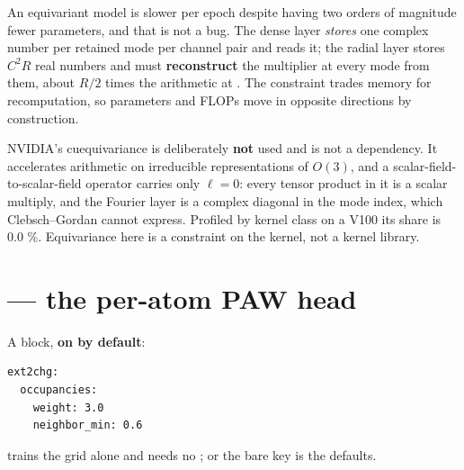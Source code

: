 \begin{pnote}
An equivariant model is slower per epoch despite having two orders of magnitude fewer parameters, and that is not a bug. The dense layer \emph{stores} one complex number per retained mode per channel pair and reads it; the radial layer stores $C^2R$ real numbers and must \textbf{reconstruct} the multiplier at every mode from them, about $R/2$ times the arithmetic at . The constraint trades memory for recomputation, so parameters and FLOPs move in opposite directions by construction.
\end{pnote}

\begin{pwarn}
NVIDIA's cuequivariance is deliberately \textbf{not} used and is not a dependency. It accelerates arithmetic on irreducible representations of $O(3)$, and a scalar-field-to-scalar-field operator carries only $\ell=0$: every tensor product in it is a scalar multiply, and the Fourier layer is a complex  diagonal in the mode index, which Clebsch--Gordan cannot express. Profiled by kernel class on a V100 its share is 0.0 \%. Equivariance here is a constraint on the kernel, not a kernel library.
\end{pwarn}

\section{ --- the per-atom PAW head}

\label{sec:paw}

A block, \textbf{on by default}:

\begin{lstlisting}
ext2chg:
  occupancies:
    weight: 3.0
    neighbor_min: 0.6
\end{lstlisting}

 trains the grid alone and needs no ;  or the bare key is the defaults.

